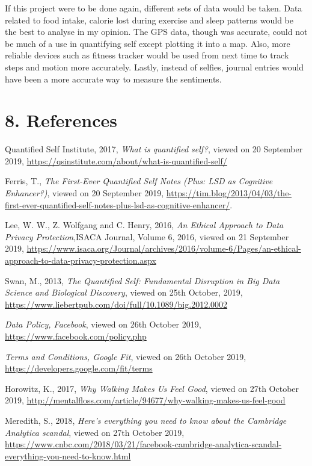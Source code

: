 \documentclass[
]{article}
\begin{document}
If this project were to be done again, different sets of data would be
taken. Data related to food intake, calorie lost during exercise and
sleep patterns would be the best to analyse in my opinion. The GPS data,
though was accurate, could not be much of a use in quantifying self
except plotting it into a map. Also, more reliable devices such as
fitness tracker would be used from next time to track steps and motion
more accurately. Lastly, instead of selfies, journal entries would have
been a more accurate way to measure the sentiments.

\hypertarget{references}{%
\section{8. References}\label{references}}

Quantified Self Institute, 2017, \emph{What is quantified self?}, viewed
on 20 September 2019,
\url{https://qsinstitute.com/about/what-is-quantified-self/}

Ferris, T., \emph{The First-Ever Quantified Self Notes (Plus: LSD as
Cognitive Enhancer?)}, viewed on 20 September 2019,
\url{https://tim.blog/2013/04/03/the-first-ever-quantified-self-notes-plus-lsd-as-cognitive-enhancer/}.

Lee, W. W., Z. Wolfgang and C. Henry, 2016, \emph{An Ethical Approach to
Data Privacy Protection},ISACA Journal, Volume 6, 2016, viewed on 21
September 2019,
\url{https://www.isaca.org/Journal/archives/2016/volume-6/Pages/an-ethical-approach-to-data-privacy-protection.aspx}

Swan, M., 2013, \emph{The Quantified Self: Fundamental Disruption in Big
Data Science and Biological Discovery}, viewed on 25th October, 2019,
\url{https://www.liebertpub.com/doi/full/10.1089/big.2012.0002}

\emph{Data Policy, Facebook}, viewed on 26th October 2019,
\url{https://www.facebook.com/policy.php}

\emph{Terms and Conditions, Google Fit}, viewed on 26th October 2019,
\url{https://developers.google.com/fit/terms}

Horowitz, K., 2017, \emph{Why Walking Makes Us Feel Good}, viewed on
27th October 2019,
\url{http://mentalfloss.com/article/94677/why-walking-makes-us-feel-good}

Meredith, S., 2018, \emph{Here's everything you need to know about the
Cambridge Analytica scandal}, viewed on 27th October 2019,
\url{https://www.cnbc.com/2018/03/21/facebook-cambridge-analytica-scandal-everything-you-need-to-know.html}
\end{document}
